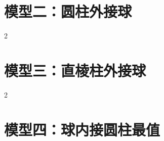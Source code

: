 \documentclass[11pt,a4paper]{ctexart}
\begin{document}
{\small \qSolidSphereModelsSummaryStem}


\section{模型二：圆柱外接球}

{\small \qSolidCylinderSphereVolumeStem}
\qSolidCylinderSphereVolumeOptions

\begin{center}
  \qSolidCylinderSphereVolumeFigure[1.0]
\end{center}

\begin{paracol}{2}
\switchcolumn
{}
\end{paracol}

\section{模型三：直棱柱外接球}

{\small \qSolidRightTriangularPrismSphereAreaStem}
\qSolidRightTriangularPrismSphereAreaOptions

\begin{center}
  \qSolidRightTriangularPrismSphereAreaFigure[1.0]
\end{center}

\begin{paracol}{2}
\switchcolumn
{}
\end{paracol}

\newpage

\section{模型四：球内接圆柱最值}

{\small \qSolidSphereInscribedCylinderMaxAreaStem}
\end{document}
